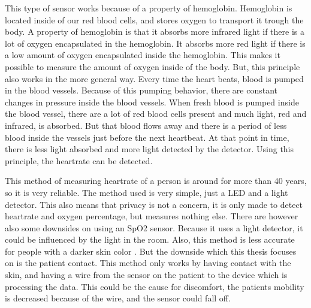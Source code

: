 This type of sensor works because of a property of hemoglobin. Hemoglobin is located inside of our red blood cells, and stores oxygen to transport it trough the body. A property of hemoglobin is that it absorbs more infrared light if there is a lot of oxygen encapsulated in the hemoglobin. It absorbs more red light if there is a low amount of oxygen encapsulated inside the hemoglobin. This makes it possible to measure the amount of oxygen inside of the body. But, this principle also works in the more general way. Every time the heart beats, blood is pumped in the blood vessels. Because of this pumping behavior, there are constant changes in pressure inside the blood vessels. When fresh blood is pumped inside the blood vessel, there are a lot of red blood cells present and much light, red and infrared, is absorbed. But that blood flows away and there is a period of less blood inside the vessels just before the next heartbeat. At that point in time, there is less light absorbed and more light detected by the detector. Using this principle, the heartrate can be detected.

This method of measuring heartrate of a person is around for more than 40 years, so it is very reliable. The method used is very simple, just a LED and a light detector. This also means that privacy is not a concern, it is only made to detect heartrate and oxygen percentage, but measures nothing else. There are however also some downsides on using an SpO2 sensor. Because it uses a light detector, it could be influenced by the light in the room. Also, this method is less accurate for people with a darker skin color \cite{feiner2007dark}. But the downside which this thesis focuses on is the patient contact. This method only works by having contact with the skin, and having a wire from the sensor on the patient to the device which is processing the data. This could be the cause for discomfort, the patients mobility is decreased because of the wire, and the sensor could fall off. 


